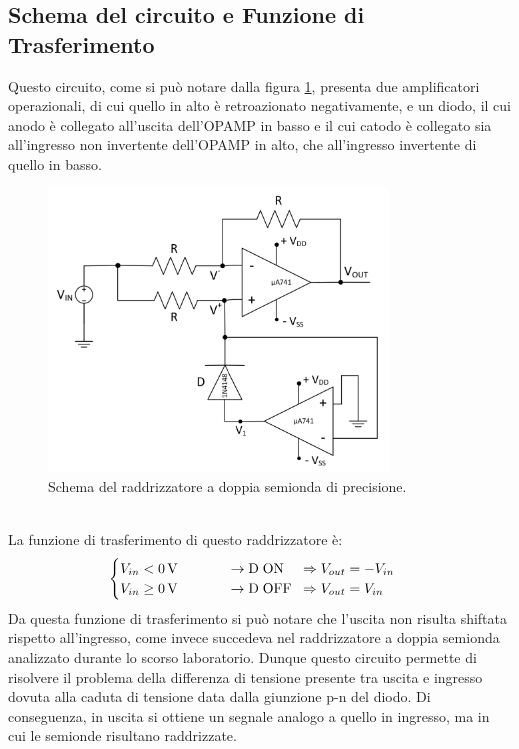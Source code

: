 \documentclass{report}
\begin{document}
\subsection{Schema del circuito e Funzione di Trasferimento}
Questo circuito, come si può notare dalla figura \ref{figura:schema1}, presenta due amplificatori operazionali, di cui quello in alto è retroazionato negativamente, e un diodo, il cui anodo è collegato all'uscita dell'OPAMP in basso e il cui catodo è collegato sia all'ingresso non invertente dell'OPAMP in alto, che all'ingresso invertente di quello in basso.
\begin{figure}[h]
	\centering
	\includegraphics[height=7.5cm]{immagini/schema1}
	\caption{Schema del raddrizzatore a doppia semionda di precisione.}
	\label{figura:schema1}
\end{figure}
\\ \noindent La funzione di trasferimento di questo raddrizzatore è:
\begin{equation}
   \begin{cases}
   V_{in}< \SI{0}{\volt}\;\;\indent\indent\rightarrow \mathrm{D\;ON}\;\;\;\; \Rightarrow V_{out} = -V_{in}\\
   V_{in}\ge \SI{0}{\volt}\;\;\indent\indent\rightarrow \mathrm{D\; OFF}\;\; \Rightarrow V_{out} = V_{in}
   \end{cases}
\end{equation}
Da questa funzione di trasferimento si può notare che l'uscita non risulta shiftata rispetto all'ingresso, come invece succedeva nel raddrizzatore a doppia semionda analizzato durante lo scorso laboratorio. Dunque questo circuito permette di risolvere il problema della differenza di tensione presente tra uscita e ingresso dovuta alla caduta di tensione data dalla giunzione p-n del diodo. Di conseguenza, in uscita si ottiene un segnale analogo a quello in ingresso, ma in cui le semionde risultano raddrizzate.
\end{document}
